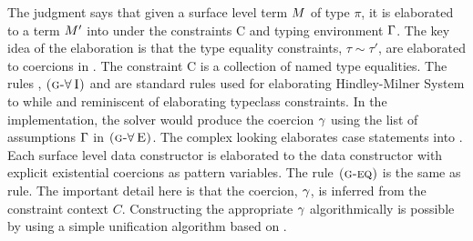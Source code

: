 \documentclass[manuscript,screen,nonacm]{acmart}
\begin{document}
\newcommand\GADTVar{
 \ib{\irule[\trule{g-var}]
 {x\co\pi \in \TEnv};
 {\GTranslate C \TEnv x {\pi} x}
 }
}
\newcommand\GADTEq{
 \ib{\irule[\trule{g-eq}]
 {\GTranslate C \TEnv \Tm \tau \Tm'}
 {\CoKinding C \Co {\tau \sim \tau'}};
 {\GTranslate C \TEnv \Tm {\tau'} {\Cast {\Tm'} \Co}}
 }
}
\newcommand\GADTForallI{
 \ib{\irule[\trule{g-$\I\forall$}]
 {\GTranslate C \TEnv \Tm \pi \Tm'}
 {\fresh \TyVar {C, \TEnv}};
 {\GTranslate C \TEnv \Tm {\Forall {\TyVar\co\star} \pi} {\TLam {\TyVar\co\star} \Tm'}}
 }
}
\newcommand\GADTForallE{
 \ib{\irule[\trule{g-$\E\forall$}]
 {\GTranslate C \TEnv \Tm {\Forall {\TyVar\co\star} \pi} \Tm'};
 {\GTranslate C \TEnv \Tm {\Set{\TyVar\mapsto\tau}\pi} {\Tm'\App \tau}}
 }
}
\newcommand\GADTCI{
 \ib{\irule[\trule{g-$\I C$}]
 {\GTranslate {C,c:\tau\sim\tau'} \TEnv \Tm {\eta} \Tm'};
 {\GTranslate C \TEnv \Tm {\tau\sim\tau'\then\eta} {\TLam {(c\co\tau\sim\tau')} \Tm'}}
 }
}
\newcommand\GADTCE{
 \ib{\irule[\trule{g-$\E C$}]
 {\GTranslate {C} \TEnv \Tm {\tau\sim\tau'\then\eta} \Tm'}
 {\CoKinding C \Co \tau\sim\tau'};
 {\GTranslate C \TEnv \Tm {\eta} {\Tm'\App\Co}}
 }
}
\newcommand\GADTAlt{
 \ib{\irule[\trule{g-alt}]
 {\substack{
 \mathlarger{H\co \Forall {\many\TyVar} {\Forall {\many\beta} {\many{\tau'\sim\tau''} \then \many\tau \to T\many\TyVar}}}\quad
 \mathlarger{\many\TyVar \cap \many\beta = \varnothing}\quad
 \mathlarger{\fvs{\many\tau, \many{\tau'}, \many{\tau''}} = \fvs{\many\TyVar, \many\beta}}\quad
 \mathlarger{\Subst = \Set{\many{\TyVar\mapsto v}}}\quad
 \mathlarger{\fresh {\many{c}} {C, \TEnv}}\\
 \mathlarger{\GTranslate {C,\many{c\co\Subst{\tau'}\sim\Subst\tau''}\,} {\,\TEnv,\many{x\co\Subst\tau}\,} \Tm {\tau'} \Tm'} }};
 {\GTranslate C \TEnv {H\App\many x \to \Tm} {T\App\many v \to \tau'}
 {H\App(\many{\beta\co\star})\App(\many{c\co\Subst\tau'\sim\Subst\tau''})\App(\many{x\co\Subst\tau}) \to \Tm' }}
 }
}


The judgment  says that given a surface level term $M$ of type $\pi$, it is elaborated to a term $M'$ into \SFC under the constraints C and typing environment $\Gamma$. The key idea of the elaboration is that the type equality constraints, $\tau\sim\tau'$, are elaborated to coercions in \SFC. The constraint C is a collection of named type equalities. The rules , $\textsc{(g-\ensuremath{\mathord{\forall}}\!~I)}$ and  are standard rules used for elaborating Hindley-Milner System to \SF while  and  reminiscent of elaborating typeclass constraints. In the implementation, the solver would produce the coercion $\gamma$ using the list of assumptions $\Gamma$ in $\textsc{(g-\ensuremath{\mathord{\forall}}\!~E)}$. The complex looking  elaborates case statements into \SFC. Each surface level data constructor is elaborated to the \SFC data constructor with explicit existential coercions as pattern variables. The rule $\textsc{(g-eq)}$ is the same as  rule. The important detail here is that the coercion, $\gamma$, is inferred from the constraint context $C$. Constructing the appropriate $\gamma$ algorithmically is possible by using a simple unification algorithm based on \cite{lassez_unification_1988}.
\end{document}
